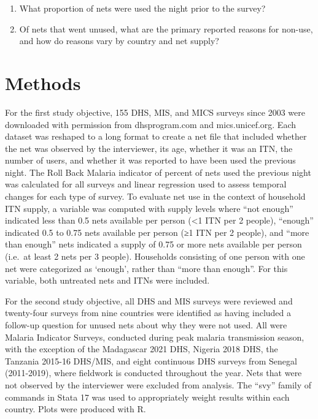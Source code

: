 \documentclass[review,
3p]{elsarticle} %
\providecommand{\tightlist}{%
  \setlength{\itemsep}{0pt}\setlength{\parskip}{0pt}}
\begin{document}
\begin{enumerate}
\def\labelenumi{\arabic{enumi}.}
\tightlist
\item
  What proportion of nets were used the night prior to the survey?
\item
  Of nets that went unused, what are the primary reported reasons for
  non-use, and how do reasons vary by country and net supply?
\end{enumerate}

\hypertarget{methods}{%
\section{Methods}\label{methods}}

For the first study objective, 155 DHS, MIS, and MICS surveys since 2003
were downloaded with permission from dhsprogram.com and mics.unicef.org.
Each dataset was reshaped to a long format to create a net file that
included whether the net was observed by the interviewer, its age,
whether it was an ITN, the number of users, and whether it was reported
to have been used the previous night. The Roll Back Malaria indicator of
percent of nets used the previous night was calculated for all surveys
and linear regression used to assess temporal changes for each type of
survey. To evaluate net use in the context of household ITN supply, a
variable was computed with supply levels where ``not enough'' indicated
less than 0.5 nets available per person (\textless1 ITN per 2 people),
``enough'' indicated 0.5 to 0.75 nets available per person (≥1 ITN per 2
people), and ``more than enough'' nets indicated a supply of 0.75 or
more nets available per person (i.e.~at least 2 nets per 3 people).
Households consisting of one person with one net were categorized as
`enough', rather than ``more than enough''. For this variable, both
untreated nets and ITNs were included.

For the second study objective, all DHS and MIS surveys were reviewed
and twenty-four surveys from nine countries were identified as having
included a follow-up question for unused nets about why they were not
used. All were Malaria Indicator Surveys, conducted during peak malaria
transmission season, with the exception of the Madagascar 2021 DHS,
Nigeria 2018 DHS, the Tanzania 2015-16 DHS/MIS, and eight continuous DHS
surveys from Senegal (2011-2019), where fieldwork is conducted
throughout the year. Nets that were not observed by the interviewer were
excluded from analysis. The ``svy'' family of commands in Stata 17 was
used to appropriately weight results within each country. Plots were
produced with R.
\end{document}
